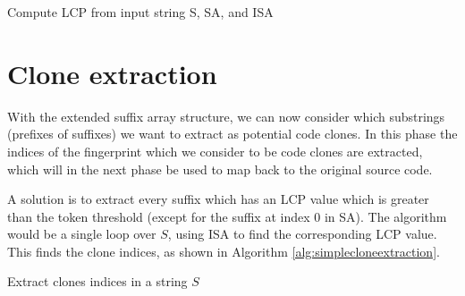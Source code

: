 \begin{algorithm}[htp]
  \SetAlgoLined\DontPrintSemicolon

  \vspace{0.5cm}
  \caption{Compute LCP from input string S, SA, and ISA}
  \label{alg:lcp}
\end{algorithm}


\section{Clone extraction}

With the extended suffix array structure, we can now consider which substrings (prefixes
of suffixes) we want to extract as potential code clones. In this phase the indices of the
fingerprint which we consider to be code clones are extracted, which will in the next
phase be used to map back to the original source code.

A solution is to extract every suffix which has an LCP value which is greater than the
token threshold (except for the suffix at index 0 in SA). The algorithm would be a single
loop over $S$, using ISA to find the corresponding LCP value. This
finds the clone indices, as shown in Algorithm \ref{alg:simplecloneextraction}.


\begin{algorithm}[htp]
  \SetAlgoLined\DontPrintSemicolon

  \vspace{0.5cm}
  \caption{Extract clones indices in a string $S$}
  \label{alg:simplecloneextraction}
\end{algorithm}


